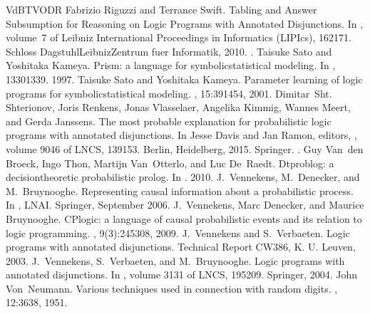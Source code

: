 \documentclass[letterpaper,10pt,english]{sphinxmanual}
\begin{document}
\begin{sphinxthebibliography}{VdBTVODR}
\sphinxAtStartPar
Fabrizio Riguzzi and Terrance Swift. Tabling and Answer Subsumption for Reasoning on Logic Programs with Annotated Disjunctions. In , volume 7 of Leibniz International Proceedings in Informatics (LIPIcs), 162\textendash{}171. Schloss Dagstuhl\textendash{}Leibniz\sphinxhyphen{}Zentrum fuer Informatik, 2010. .
\sphinxAtStartPar
Taisuke Sato and Yoshitaka Kameya. Prism: a language for symbolic\sphinxhyphen{}statistical modeling. In , 1330\textendash{}1339. 1997.
\sphinxAtStartPar
Taisuke Sato and Yoshitaka Kameya. Parameter learning of logic programs for symbolic\sphinxhyphen{}statistical modeling. , 15:391\textendash{}454, 2001.
\sphinxAtStartPar
Dimitar Sht. Shterionov, Joris Renkens, Jonas Vlasselaer, Angelika Kimmig, Wannes Meert, and Gerda Janssens. The most probable explanation for probabilistic logic programs with annotated disjunctions. In Jesse Davis and Jan Ramon, editors, , volume 9046 of LNCS, 139\textendash{}153. Berlin, Heidelberg, 2015. Springer. .
\sphinxAtStartPar
Guy Van den Broeck, Ingo Thon, Martijn Van Otterlo, and Luc De Raedt. Dtproblog: a decision\sphinxhyphen{}theoretic probabilistic prolog. In . 2010.
\sphinxAtStartPar
J. Vennekens, M. Denecker, and M. Bruynooghe. Representing causal information about a probabilistic process. In , LNAI. Springer, September 2006.
\sphinxAtStartPar
J. Vennekens, Marc Denecker, and Maurice Bruynooghe. CP\sphinxhyphen{}logic: a language of causal probabilistic events and its relation to logic programming. , 9(3):245\textendash{}308, 2009.
\sphinxAtStartPar
J. Vennekens and S. Verbaeten. Logic programs with annotated disjunctions. Technical Report CW386, K. U. Leuven, 2003.
\sphinxAtStartPar
J. Vennekens, S. Verbaeten, and M. Bruynooghe. Logic programs with annotated disjunctions. In , volume 3131 of LNCS, 195\textendash{}209. Springer, 2004.
\sphinxAtStartPar
John Von Neumann. Various techniques used in connection with random digits. , 12:36\textendash{}38, 1951.
\end{sphinxthebibliography}



\renewcommand{\indexname}{Index}
\printindex
\end{document}
